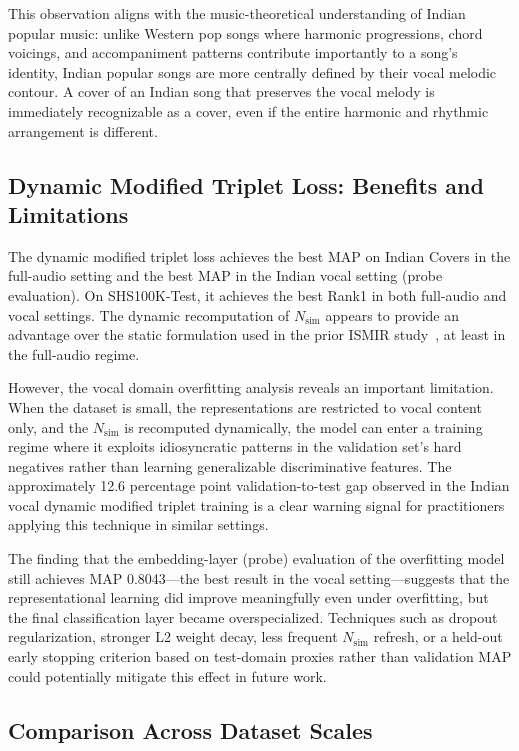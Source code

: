 \documentclass[conference]{IEEEtran}
\begin{document}
This observation aligns with the music-theoretical understanding of Indian popular music: unlike Western pop songs where harmonic progressions, chord voicings, and accompaniment patterns contribute importantly to a song's identity, Indian popular songs are more centrally defined by their vocal melodic contour. A cover of an Indian song that preserves the vocal melody is immediately recognizable as a cover, even if the entire harmonic and rhythmic arrangement is different.

\subsection{Dynamic Modified Triplet Loss: Benefits and Limitations}

The dynamic modified triplet loss achieves the best MAP on Indian Covers in the full-audio setting and the best MAP in the Indian vocal setting (probe evaluation). On SHS100K-Test, it achieves the best Rank1 in both full-audio and vocal settings. The dynamic recomputation of $N_{\text{sim}}$ appears to provide an advantage over the static formulation used in the prior ISMIR study~\cite{ismir_paper}, at least in the full-audio regime.

However, the vocal domain overfitting analysis reveals an important limitation. When the dataset is small, the representations are restricted to vocal content only, and the $N_{\text{sim}}$ is recomputed dynamically, the model can enter a training regime where it exploits idiosyncratic patterns in the validation set's hard negatives rather than learning generalizable discriminative features. The approximately 12.6 percentage point validation-to-test gap observed in the Indian vocal dynamic modified triplet training is a clear warning signal for practitioners applying this technique in similar settings.

The finding that the embedding-layer (probe) evaluation of the overfitting model still achieves MAP 0.8043—the best result in the vocal setting—suggests that the representational learning did improve meaningfully even under overfitting, but the final classification layer became overspecialized. Techniques such as dropout regularization, stronger L2 weight decay, less frequent $N_{\text{sim}}$ refresh, or a held-out early stopping criterion based on test-domain proxies rather than validation MAP could potentially mitigate this effect in future work.

\subsection{Comparison Across Dataset Scales}
\end{document}
